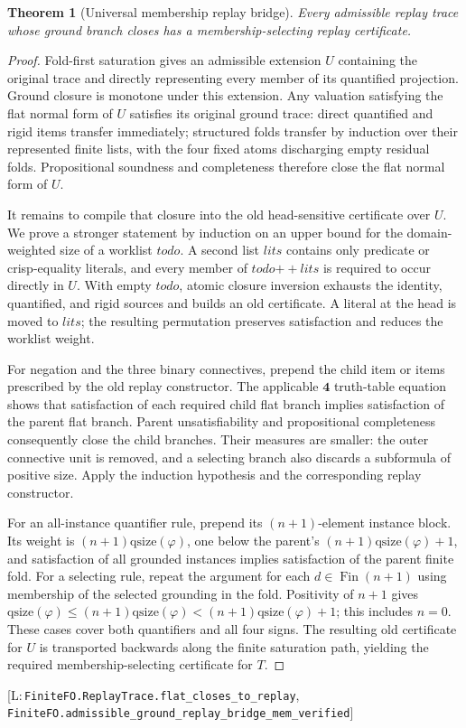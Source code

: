 \documentclass[11pt,a4paper]{article}
\newtheorem{theorem}{Theorem}[section]
\theoremstyle{definition}
\newcommand{\FOUR}{\mathbf{4}}
\newcommand{\lean}[1]{\texttt{#1}}
\newenvironment{leanrefs}
  {\par\smallskip\noindent\begin{minipage}{\linewidth}\small\raggedright}
  {\end{minipage}\par\smallskip}
\newcommand{\qsize}{\mathrm{qsize}}
\begin{document}
\begin{theorem}[Universal membership replay bridge]\label{thm:memreplay}
Every admissible replay trace whose ground branch closes has a
membership-selecting replay certificate.
\end{theorem}
\begin{proof}
Fold-first saturation gives an admissible extension $U$ containing the
original trace and directly representing every member of its quantified
projection.  Ground closure is monotone under this extension.  Any
valuation satisfying the flat normal form of $U$ satisfies its original
ground trace: direct quantified and rigid items transfer immediately;
structured folds transfer by induction over their represented finite
lists, with the four fixed atoms discharging empty residual folds.
Propositional soundness and completeness therefore close the flat normal
form of $U$.

It remains to compile that closure into the old head-sensitive certificate
over $U$.  We prove a stronger statement by induction on an upper bound for
the domain-weighted size of a worklist $\mathit{todo}$.  A second list
$\mathit{lits}$ contains only predicate or crisp-equality literals, and
every member of $\mathit{todo}\mathbin{+\!+}\mathit{lits}$ is required to
occur directly in $U$.  With empty $\mathit{todo}$, atomic closure
inversion exhausts the identity, quantified, and rigid sources and builds
an old certificate.  A literal at the head is moved to $\mathit{lits}$;
the resulting permutation preserves satisfaction and reduces the
worklist weight.

For negation and the three binary connectives, prepend the child item or
items prescribed by the old replay constructor.  The applicable
$\FOUR$ truth-table equation shows that satisfaction of each required
child flat branch implies satisfaction of the parent flat branch.  Parent
unsatisfiability and propositional completeness consequently close the
child branches.  Their measures are smaller: the outer connective unit is
removed, and a selecting branch also discards a subformula of positive
size.  Apply the induction hypothesis and the corresponding replay
constructor.

For an all-instance quantifier rule, prepend its $(n+1)$-element instance
block.  Its weight is $(n+1)\qsize(\varphi)$, one below the parent's
$(n+1)\qsize(\varphi)+1$, and satisfaction of all grounded instances
implies satisfaction of the parent finite fold.  For a selecting rule,
repeat the argument for each $d\in\operatorname{Fin}(n+1)$ using
membership of the selected grounding in the fold.  Positivity of $n+1$
gives
$\qsize(\varphi)\leq(n+1)\qsize(\varphi)<
(n+1)\qsize(\varphi)+1$; this includes $n=0$.  These cases cover both
quantifiers and all four signs.  The resulting old certificate for $U$
is transported backwards along the finite saturation path, yielding the
required membership-selecting certificate for $T$.
\end{proof}
\begin{leanrefs}
[L:\,\lean{FiniteFO.ReplayTrace.flat\_closes\_to\_replay},
\lean{FiniteFO.admissible\_ground\_replay\_bridge\_mem\_verified}]
\end{leanrefs}
\end{document}
